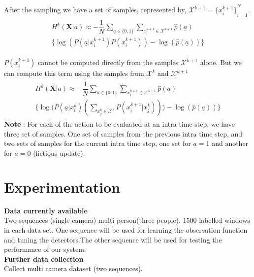 \documentclass[10pt,twocolumn,letterpaper]{article}
\begin{document}
After the sampling we have a set of samples, represented by,
 $\mathcal{X}^{k+1}={\lbrace x^{k+1}_{i}\rbrace}^{N}_{i=1}$.
\begin{align}
\begin{split}
H^{k}(\textbf{X}| a)\approx -\dfrac{1}{N}\sum_{\underline{a}\in\lbrace 0 ,1 \rbrace} \sum_{x_{i}^{k+1}\in\mathcal{X}^{k+1}} \widehat{p}( \underline{a})\\ \Big\lbrace\log(P( \underline{a}|x^{k+1}_{i})P(x^{k+1}_{i})) - \log(\widehat{p}( \underline{a}))\Big\rbrace
\end{split}
\end{align}

$P(x^{k+1}_{i})$ cannot be computed directly from the samples $\mathcal{X}^{k+1}$ alone. But we can compute this term using the samples from $\mathcal{X}^{k}$ and $\mathcal{X}^{k+1}$
\begin{align}
\begin{split}
H^{k}(\textbf{X}| a)\approx -\dfrac{1}{N}\sum_{\underline{a}\in\lbrace 0 ,1 \rbrace} \sum_{x_{i}^{k+1}\in\mathcal{X}^{k+1}} \widehat{p}( \underline{a}) \\ \Big\lbrace\log\Big(P( \underline{a}|x^{k}_{i})(\sum_{x_{j}^{k}\in\mathcal{X}^{k}}P(x^{k+1}_{i}|x^{k}_{j}))\Big) - \log(\widehat{p}( \underline{a}))\Big\rbrace
\end{split}
\end{align}
\textbf{Note} :
For each of the action to be evaluated at an intra-time step, we have three set of samples. One set of samples from the previous intra time step, and two sets of samples for the current intra time step, one set for $\underline{a}=1$ and another for $\underline{a}=0$ (fictious update).
  
\section{Experimentation}

\textbf{Data currently available}\\ 
Two sequences (single camera) multi person(three people). 1500 labelled windows in each data set. One sequence will be used for learning the observation function and tuning the detectors.The other sequence will be used for testing the performance of our system.\\

\textbf{Further data collection}\\
Collect multi camera dataset (two sequences).\\
\end{document}
